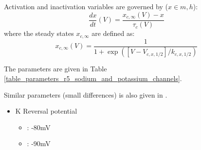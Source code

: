 \documentclass[../../workflow.tex]{subfiles}
\begin{document}
Activation and inactivation variables are governed by ($x \in {m,h}$):
\begin{equation*}
    \frac{dx}{dt}(V) = \frac{x_{c,\infty}(V) - x}{\tau_{c}(V)}
\end{equation*}
where the steady states $x_{c,\infty}$ are defined as:
\begin{equation*}
    x_{c,\infty}(V) = \frac{1}{1 + \exp{([V - V_{c,x,1/2}]/k_{c,x,1/2})}}
\end{equation*}

The parameters are given in Table \ref{table_parameters_r5_sodium_and_potassium_channels}.

\begin{table}[h!]
    \centering
    \caption{Channel parameters for activation and inactivation of sodium and potassium channels.}
    \label{table_parameters_r5_sodium_and_potassium_channels}
\end{table}

\begin{note}
    Similar parameters (small differences) is also given in \cite{linActivityDependentAlternativeSplicing2012}.
\end{note}

\begin{itemize}
    \item K Reversal potential
    \begin{itemize}
        \item \cite{gunayDistalSpikeInitiation2015}: -80mV
        \item \cite{qiuCollectiveDynamicsNeural2021}: -90mV
    \end{itemize}
\end{itemize}
\end{document}
